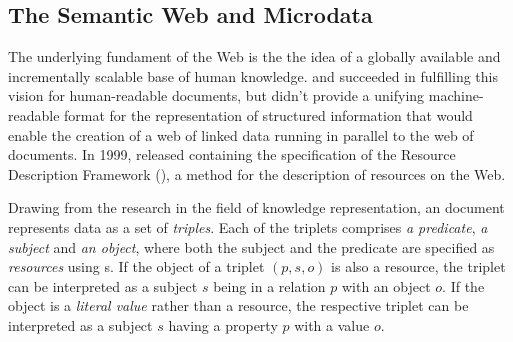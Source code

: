 \documentclass{book}
\begin{document}


      \subsection{The Semantic Web and Microdata}
        The underlying fundament of the Web is the the idea of a globally
        available and incrementally scalable base of human knowledge.
         and  succeeded in fulfilling this vision
        for human-readable documents, but didn't provide a unifying
        machine-readable format for the representation of structured information
        that would enable the creation of a web of linked data running in
        parallel to the web of documents. In 1999,  released
        \cite{lassira99} containing the specification of the Resource
        Description Framework (), a method for the description of
        resources on the Web.

        Drawing from the research in the field of knowledge representation, an
         document represents data as a set of \emph{triples}. Each
        of the triplets comprises \emph{a predicate}, \emph{a subject} and
        \emph{an object}, where both the subject and the predicate are specified
        as \emph{resources} using s. If the object of a
        triplet $(p,s,o)$ is also a resource, the triplet can be interpreted as
        a subject $s$ being in a relation $p$ with an object $o$. If the object
        is a \emph{literal value} rather than a resource, the respective triplet
        can be interpreted as a subject $s$ having a property $p$ with a value
        $o$.
\end{document}
